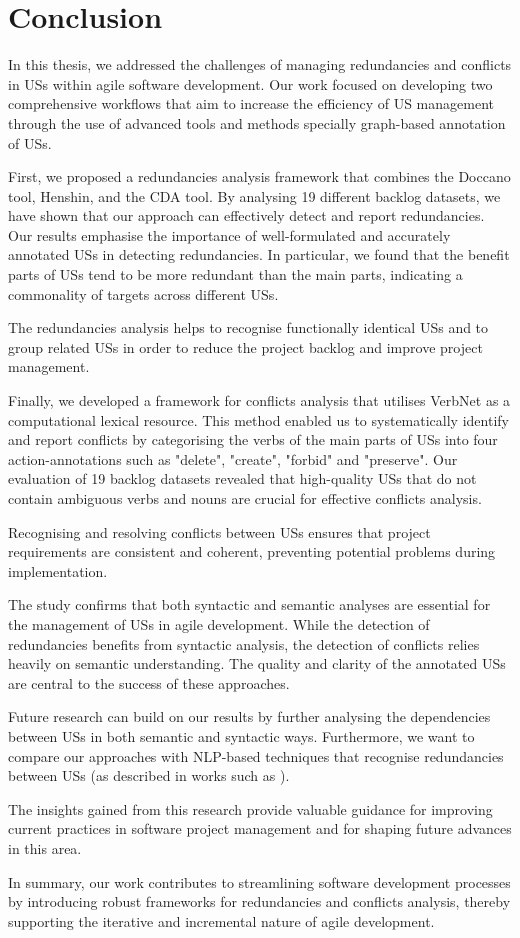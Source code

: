 \section{Conclusion}\label{conclusion}
In this thesis, we addressed the challenges of managing redundancies and conflicts in USs within agile software development. Our work focused on developing two comprehensive workflows that aim to increase the efficiency of US management through the use of advanced tools and methods specially graph-based annotation of USs.

First, we proposed a redundancies analysis framework that combines the Doccano tool, Henshin, and the CDA tool. By analysing 19 different backlog datasets, we have shown that our approach can effectively detect and report redundancies. Our results emphasise the importance of well-formulated and accurately annotated USs in detecting redundancies. In particular, we found that the benefit parts of USs tend to be more redundant than the main parts, indicating a commonality of targets across different USs.

The redundancies analysis helps to recognise functionally identical USs and to group related USs in order to reduce the project backlog and improve project management.

Finally, we developed a framework for conflicts analysis that utilises VerbNet as a computational lexical resource. This method enabled us to systematically identify and report conflicts by categorising the verbs of the main parts of USs into four action-annotations such as "delete", "create", "forbid" and "preserve". Our evaluation of 19 backlog datasets revealed that high-quality USs that do not contain ambiguous verbs and nouns are crucial for effective conflicts analysis.

Recognising and resolving conflicts between USs ensures that project requirements are consistent and coherent, preventing potential problems during implementation.

The study confirms that both syntactic and semantic analyses are essential for the management of USs in agile development. While the detection of redundancies benefits from syntactic analysis, the detection of conflicts relies heavily on semantic understanding. The quality and clarity of the annotated USs are central to the success of these approaches.

Future research can build on our results by further analysing the dependencies between USs in both semantic and syntactic ways. Furthermore, we want to compare our approaches with NLP-based techniques that recognise redundancies between USs (as described in works such as \cite{duszkiewicz2022identifying,jurischsimilarity,levin1993english}). 

The insights gained from this research provide valuable guidance for improving current practices in software project management and for shaping future advances in this area.

In summary, our work contributes to streamlining software development processes by introducing robust frameworks for redundancies and conflicts analysis, thereby supporting the iterative and incremental nature of agile development.